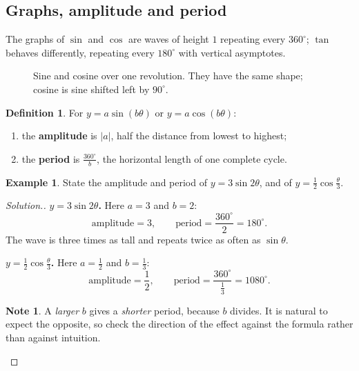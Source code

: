 \documentclass[11pt,a4paper]{article}
\theoremstyle{definition}
\newtheorem{definition}[thm]{Definition}
\newtheorem{example}[thm]{Example}
\newtheorem{note}[thm]{Note}
\newenvironment{solution}
  {\renewcommand{\qedsymbol}{}\begin{proof}[\textit{Solution}.]}
  {\end{proof}}
\begin{document}
\subsection{Graphs, amplitude and period}

The graphs of $\sin$ and $\cos$ are waves of height $1$ repeating every $360^\circ$;
$\tan$ behaves differently, repeating every $180^\circ$ with vertical asymptotes.

\begin{figure}[H]
\centering
{}
\caption{Sine and cosine over one revolution. They have the same shape; cosine is sine shifted left by $90^\circ$.}
\end{figure}

\begin{definition}
For $y=a\sin(b\theta)$ or $y=a\cos(b\theta)$:
\begin{enumerate}
\item[(i).] the \textbf{amplitude} is $|a|$, half the distance from lowest to highest;
\item[(ii).] the \textbf{period} is $\frac{360^\circ}{b}$, the horizontal length of one
complete cycle.
\end{enumerate}
\end{definition}

\begin{example}
State the amplitude and period of $y=3\sin 2\theta$, and of $y=\frac{1}{2}\cos\frac{\theta}{3}$.
\end{example}

\begin{solution}
\textbf{$y=3\sin 2\theta$.} Here $a=3$ and $b=2$:
$$\text{amplitude}=3,\qquad \text{period}=\frac{360^\circ}{2}=180^\circ.$$
The wave is three times as tall and repeats twice as often as $\sin\theta$.

\textbf{$y=\frac{1}{2}\cos\frac{\theta}{3}$.} Here $a=\frac{1}{2}$ and
$b=\frac{1}{3}$:
$$\text{amplitude}=\frac{1}{2},\qquad
\text{period}=\frac{360^\circ}{\frac{1}{3}}=1080^\circ.$$

\begin{note}
A \emph{larger} $b$ gives a \emph{shorter} period, because $b$ divides. It is natural
to expect the opposite, so check the direction of the effect against the formula rather
than against intuition.
\end{note}
\end{solution}
\end{document}
